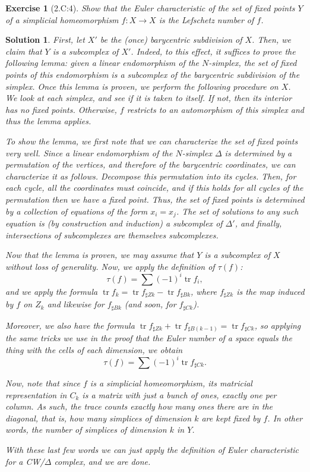 \documentclass{article}
\theoremstyle{plain}
\newtheorem*{ex}{Exercise}
\theoremstyle{nonumberplain}
\newtheorem{sol}{Solution}
\DeclareMathOperator{\trace}{tr}
\begin{document}
\begin{ex}[2.C:4]
Show that the Euler characteristic of the set of fixed points $Y$ of a simplicial homeomorphism $f \colon X \to X$ is the Lefschetz number of $f$.
\end{ex}

\begin{sol}
First, let $X'$ be the (once) barycentric subdivision of $X$. Then, we claim that $Y$ is a subcomplex of $X'$. Indeed, to this effect, it suffices to prove the following lemma: given a linear endomorphism of the $N$-simplex, the set of fixed points of this endomorphism is a subcomplex of the barycentric subdivision of the simplex. Once this lemma is proven, we perform the following procedure on $X$. We look at each simplex, and see if it is taken to itself. If not, then its interior has no fixed points. Otherwise, $f$ restricts to an automorphism of this simplex and thus the lemma applies.

To show the lemma, we first note that we can characterize the set of fixed points very well. Since a linear endomorphism of the $N$-simplex $\Delta$ is determined by a permutation of the vertices, and therefore of the barycentric coordinates, we can characterize it as follows. Decompose this permutation into its cycles. Then, for each cycle, all the coordinates must coincide, and if this holds for all cycles of the permutation then we have a fixed point. Thus, the set of fixed points is determined by a collection of equations of the form $x_i = x_j$. The set of solutions to any such equation is (by construction and induction) a subcomplex of $\Delta'$, and finally, intersections of subcomplexes are themselves subcomplexes.

Now that the lemma is proven, we may assume that $Y$ is a subcomplex of $X$ without loss of generality. Now, we apply the definition of $\tau(f)$:
\begin{equation}
\tau(f) = \sum (-1)^i \trace f_i,
\end{equation}
and we apply the formula $\trace f_k = \trace f_{\sharp Z k} - \trace f_{\sharp B k}$, where $f_{\sharp Z k}$ is the map induced by $f$ on $Z_k$ and likewise for $f_{\sharp B k}$ (and soon, for $f_{\sharp C k}$).

Moreover, we also have the formula $\trace f_{\sharp Z k} + \trace f_{\sharp B (k-1)} = \trace f_{\sharp C k}$, so applying the same tricks we use in the proof that the Euler number of a space equals the thing with the cells of each dimension, we obtain
\begin{equation}
\tau(f) = \sum (-1)^i \trace f_{\sharp C k}.
\end{equation}

Now, note that since $f$ is a simplicial homeomorphism, its matricial representation in $C_k$ is a matrix with just a bunch of ones, exactly one per column. As such, the trace counts exactly how many ones there are in the diagonal, that is, how many simplices of dimension $k$ are kept fixed by $f$. In other words, \emph{the number of simplices of dimension $k$ in $Y$}.

With these last few words we can just apply the definition of Euler characteristic for a CW/$\Delta$ complex, and we are done.
\end{sol}
\end{document}
